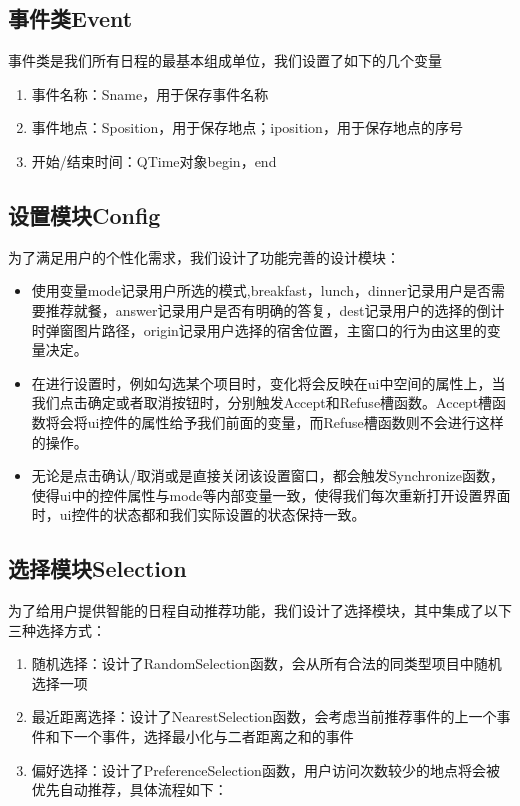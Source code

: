 \documentclass[11pt,hyperref,a4paper,UTF8]{ctexart}
\begin{document}
\begin{CJK}{UTF8}{gkai}
\subsection{事件类Event}
\label{event}
事件类是我们所有日程的最基本组成单位，我们设置了如下的几个变量
\begin{enumerate}
    \item 事件名称：Sname，用于保存事件名称
    \item 事件地点：Sposition，用于保存地点；iposition，用于保存地点的序号
    \item 开始/结束时间：QTime对象begin，end
\end{enumerate}
\subsection{设置模块Config}
为了满足用户的个性化需求，我们设计了功能完善的设计模块：

\begin{itemize}
    \item 使用变量mode记录用户所选的模式,breakfast，lunch，dinner记录用户是否需要推荐就餐，answer记录用户是否有明确的答复，dest记录用户的选择的倒计时弹窗图片路径，origin记录用户选择的宿舍位置，主窗口的行为由这里的变量决定。
    \item 在进行设置时，例如勾选某个项目时，变化将会反映在ui中空间的属性上，当我们点击确定或者取消按钮时，分别触发Accept和Refuse槽函数。Accept槽函数将会将ui控件的属性给予我们前面的变量，而Refuse槽函数则不会进行这样的操作。
    \item 无论是点击确认/取消或是直接关闭该设置窗口，都会触发Synchronize函数，使得ui中的控件属性与mode等内部变量一致，使得我们每次重新打开设置界面时，ui控件的状态都和我们实际设置的状态保持一致。
\end{itemize}

\subsection{选择模块Selection}
为了给用户提供智能的日程自动推荐功能，我们设计了选择模块，其中集成了以下三种选择方式：
\begin{enumerate}
    \item 随机选择：设计了RandomSelection函数，会从所有合法的同类型项目中随机选择一项
    \item 最近距离选择：设计了NearestSelection函数，会考虑当前推荐事件的上一个事件和下一个事件，选择最小化与二者距离之和的事件
    \item 偏好选择：设计了PreferenceSelection函数，用户访问次数较少的地点将会被优先自动推荐，具体流程如下：
    

\end{enumerate}
\end{CJK}
\end{document}
